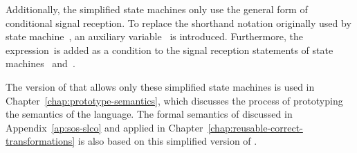 Additionally, the simplified state machines only use the general form of conditional signal reception.
To replace the shorthand notation originally used by state machine~, an auxiliary variable~ is introduced.
Furthermore, the expression~\SLCOTrue is added as a condition to the signal reception statements of state machines~ and~.

The version of \SLCO that allows only these simplified state machines is used in Chapter~\ref{chap:prototype-semantics}, which discusses the process of prototyping the semantics of the language.
The formal semantics of \SLCO discussed in Appendix~\ref{ap:sos-slco} and applied in Chapter~\ref{chap:reusable-correct-transformations} is also based on this simplified version of \SLCO. 